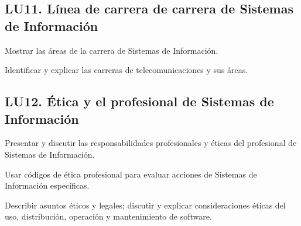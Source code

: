 \subsection{LU11. Línea de carrera de carrera de Sistemas de Información}\label{sec:BOK-LU11}\label{sec:LU11}
\begin{LearningUnit}
\begin{LUGoal}
\item Mostrar las áreas de la carrera de Sistemas de Información.
\end{LUGoal}

\begin{LUObjective}
\item Identificar y explicar las carreras de telecomunicaciones y sus áreas.
\end{LUObjective}
\end{LearningUnit}

\subsection{LU12. Ética y el profesional de Sistemas de Información}\label{sec:BOK-LU12}\label{sec:LU12}
\begin{LearningUnit}
\begin{LUGoal}
\item Presentar y discutir las responsabilidades profesionales y éticas del profesional de Sistemas de Información.
\end{LUGoal}

\begin{LUObjective}
\item Usar códigos de ética profesional para evaluar acciones de Sistemas de Información específicas.
\item Describir asuntos éticos y legales; discutir y explicar consideraciones éticas del uso, distribución, operación y mantenimiento de software.
\end{LUObjective}
\end{LearningUnit}

